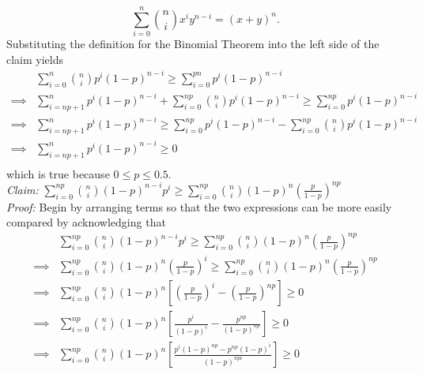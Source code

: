 \documentclass{article}
\begin{document}
\begin{enumerate}[(a)]
					\begin{equation*}
						\sum_{i = 0}^n{n \choose i}x^iy^{n - i} = (x + y)^n.
					\end{equation*}
				Substituting the definition for the Binomial Theorem into the left side of the claim yields
					\begin{equation*}\begin{aligned}
						       & \sum_{i=0}^n{n \choose i}p^i(1 -p)^{n - i} \ge \sum_{i = 0}^{pn}p^i(1 - p)^{n - i} \\
					\implies & \sum_{i = np + 1}^n p^i(1 - p)^{n - i} + \sum_{i=0}^{np}{n \choose i}p^i(1 -p)^{n - i} \ge \sum_{i = 0}^{np}p^i(1 - p)^{n - i} \\
					\implies & \sum_{i = np + 1}^n p^i(1 - p)^{n - i} \ge \sum_{i = 0}^{np}p^i(1 - p)^{n - i}  - \sum_{i=0}^{np}{n \choose i}p^i(1 -p)^{n - i}\\
					\implies & \sum_{i = np + 1}^n p^i(1 - p)^{n - i} \ge 0\\
					\end{aligned}\end{equation*}
				which is true because $0 \le p \le 0.5$. \\[0.2in]
				{\it Claim: } $\sum_{i = 0}^{np} {n \choose i}(1 - p)^{n - i}p^i \ge \sum_{i = 0}^{np} {n\choose i}(1 - p)^n\left ( \frac{p}{1 - p}\right )^{np}$ \\[0.2in]
				{\it Proof: } Begin by arranging terms so that the two expressions can be more easily compared by acknowledging that 
					\begin{equation*}\begin{aligned}
						        & \sum_{i = 0}^{np} {n \choose i}(1 - p)^{n - i}p^i \ge \sum_{i = 0}^{np} {n\choose i}(1 - p)^n\left ( \frac{p}{1 - p}\right )^{np} \\
					\implies  & \sum_{i = 0}^{np} {n \choose i}(1 - p)^n \left ( \frac{p}{1 - p} \right )^i \ge \sum_{i = 0}^{np} {n\choose i}(1 - p)^n\left ( \frac{p}{1 - p}\right )^{np} \\
					\implies  & \sum_{i = 0}^{np} {n \choose i}(1 - p)^n \left [ \left ( \frac{p}{1 - p} \right )^i  - \left (\frac{p}{1 - p}\right )^{np} \right ] \ge 0 \\
					\implies  & \sum_{i = 0}^{np} {n \choose i}(1 - p)^n \left [ \frac{p^i}{(1 - p)^i}  - \frac{p^{np}}{(1 - p)^{np}} \right ] \ge 0 \\
					\implies  & \sum_{i = 0}^{np} {n \choose i}(1 - p)^n \left [ \frac{p^i(1 - p)^{np} - p^{np}(1 - p)^i}{(1 - p)^{npi}}\right ] \ge 0 \\

\end{aligned}
\end{equation*}
\end{enumerate}
\end{document}
